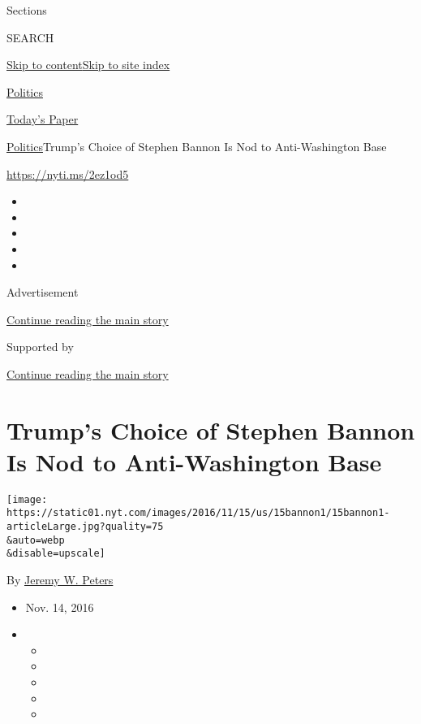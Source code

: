 Sections

SEARCH

\protect\hyperlink{site-content}{Skip to
content}\protect\hyperlink{site-index}{Skip to site index}

\href{https://www.nytimes.com/section/politics}{Politics}

\href{https://myaccount.nytimes.com/auth/login?response_type=cookie\&client_id=vi}{}

\href{https://www.nytimes.com/section/todayspaper}{Today's Paper}

\href{/section/politics}{Politics}\textbar{}Trump's Choice of Stephen
Bannon Is Nod to Anti-Washington Base

\url{https://nyti.ms/2ez1od5}

\begin{itemize}
\item
\item
\item
\item
\item
\end{itemize}

Advertisement

\protect\hyperlink{after-top}{Continue reading the main story}

Supported by

\protect\hyperlink{after-sponsor}{Continue reading the main story}

\hypertarget{trumps-choice-of-stephen-bannon-is-nod-to-anti-washington-base}{%
\section{Trump's Choice of Stephen Bannon Is Nod to Anti-Washington
Base}\label{trumps-choice-of-stephen-bannon-is-nod-to-anti-washington-base}}

\texttt{[image: https://static01.nyt.com/images/2016/11/15/us/15bannon1/15bannon1-articleLarge.jpg?quality=75\\\&auto=webp\\\&disable=upscale]}

By \href{http://www.nytimes.com/by/jeremy-w-peters}{Jeremy W. Peters}

\begin{itemize}
\item
  Nov. 14, 2016
\item
  \begin{itemize}
  \item
  \item
  \item
  \item
  \item
  \end{itemize}
\end{itemize}

